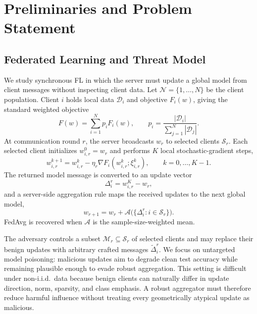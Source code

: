 \section{Preliminaries and Problem Statement}
\label{sec:problem}

\subsection{Federated Learning and Threat Model}

We study synchronous FL in which the server must update a global model from client messages without inspecting client data. Let $\mathcal{N}=\{1,\dots,N\}$ be the client population. Client $i$ holds local data $\mathcal{D}_i$ and objective $F_i(w)$, giving the standard weighted objective
\begin{equation}
F(w)=\sum_{i=1}^N p_i F_i(w),
\qquad
p_i=\frac{|\mathcal{D}_i|}{\sum_{j=1}^N|\mathcal{D}_j|}.
\label{eq:fl-objective}
\end{equation}
At communication round $r$, the server broadcasts $w_r$ to selected clients $\mathcal{S}_r$. Each selected client initializes $w_{i,r}^{0}=w_r$ and performs $K$ local stochastic-gradient steps,
\begin{equation}
w_{i,r}^{k+1}=w_{i,r}^{k}-\eta_r \nabla F_i(w_{i,r}^{k};\xi_{i,r}^{k}),
\qquad k=0,\dots,K-1.
\label{eq:local-update}
\end{equation}
The returned model message is converted to an update vector
\begin{equation}
\Delta_i^r=w_{i,r}^{K}-w_r,
\label{eq:delta-def}
\end{equation}
and a server-side aggregation rule maps the received updates to the next global model,
\begin{equation}
w_{r+1}=w_r+\mathcal{A}\big(\{\Delta_i^r:i\in\mathcal{S}_r\}\big).
\label{eq:generic-aggregation}
\end{equation}
FedAvg is recovered when $\mathcal{A}$ is the sample-size-weighted mean.

The adversary controls a subset $\mathcal{M}_r\subseteq\mathcal{S}_r$ of selected clients and may replace their benign updates with arbitrary crafted messages $\widetilde{\Delta}_i^r$. We focus on untargeted model poisoning: malicious updates aim to degrade clean test accuracy while remaining plausible enough to evade robust aggregation. This setting is difficult under non-i.i.d.\ data because benign clients can naturally differ in update direction, norm, sparsity, and class emphasis. A robust aggregator must therefore reduce harmful influence without treating every geometrically atypical update as malicious.

